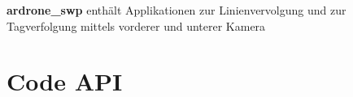 

{\bfseries ardrone\_\-swp} enthält Applikationen zur Linienvervolgung und zur Tagverfolgung mittels vorderer und unterer Kamera\hypertarget{index_codeapi}{}\section{Code API}\label{index_codeapi}
